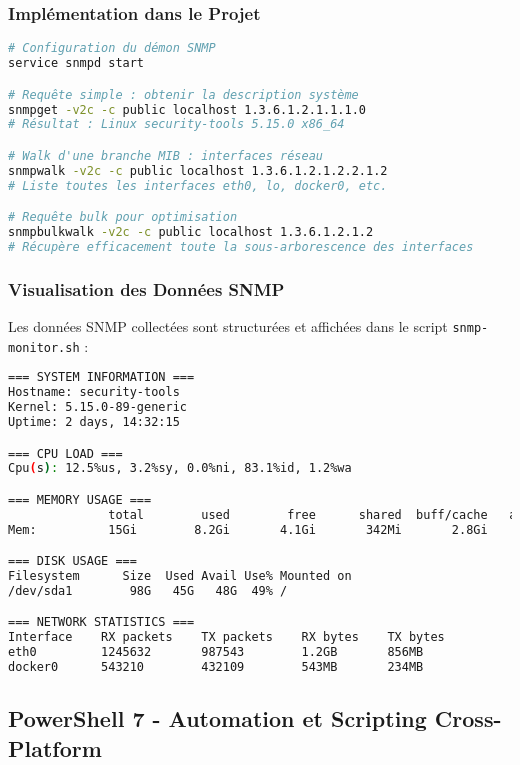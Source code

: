 \subsubsection{Implémentation dans le Projet}
\begin{lstlisting}[language=bash, caption=Exemples de Requêtes SNMP, basicstyle=\ttfamily\tiny]
# Configuration du démon SNMP
service snmpd start

# Requête simple : obtenir la description système
snmpget -v2c -c public localhost 1.3.6.1.2.1.1.1.0
# Résultat : Linux security-tools 5.15.0 x86_64

# Walk d'une branche MIB : interfaces réseau
snmpwalk -v2c -c public localhost 1.3.6.1.2.1.2.2.1.2
# Liste toutes les interfaces eth0, lo, docker0, etc.

# Requête bulk pour optimisation
snmpbulkwalk -v2c -c public localhost 1.3.6.1.2.1.2
# Récupère efficacement toute la sous-arborescence des interfaces
\end{lstlisting}

\subsubsection{Visualisation des Données SNMP}
Les données SNMP collectées sont structurées et affichées dans le script \texttt{snmp-monitor.sh} :

\begin{lstlisting}[language=bash, caption=Structure du Rapport SNMP, basicstyle=\ttfamily\tiny]
=== SYSTEM INFORMATION ===
Hostname: security-tools
Kernel: 5.15.0-89-generic
Uptime: 2 days, 14:32:15

=== CPU LOAD ===
Cpu(s): 12.5%us, 3.2%sy, 0.0%ni, 83.1%id, 1.2%wa

=== MEMORY USAGE ===
              total        used        free      shared  buff/cache   available
Mem:          15Gi        8.2Gi       4.1Gi       342Mi       2.8Gi       6.5Gi

=== DISK USAGE ===
Filesystem      Size  Used Avail Use% Mounted on
/dev/sda1        98G   45G   48G  49% /

=== NETWORK STATISTICS ===
Interface    RX packets    TX packets    RX bytes    TX bytes
eth0         1245632       987543        1.2GB       856MB
docker0      543210        432109        543MB       234MB
\end{lstlisting}

\subsection{PowerShell 7 - Automation et Scripting Cross-Platform}

